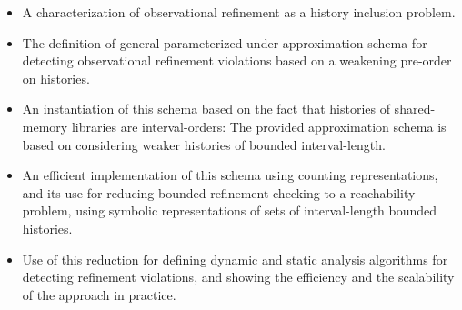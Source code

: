 \begin{itemize}
\item
A characterization of observational refinement as a history inclusion problem.


\item 
The definition of general parameterized under-approximation schema for detecting observational refinement violations based on a weakening pre-order on histories.

\item
An instantiation of this schema based on the fact that histories of shared-memory libraries are interval-orders: The provided approximation schema is based on considering weaker histories of bounded interval-length.

\item
An efficient implementation of this schema using counting representations, and its use for reducing bounded refinement checking to a reachability problem, using %
symbolic representations of sets of interval-length bounded histories.



\item 
Use of this reduction for defining dynamic and static analysis algorithms for detecting refinement violations, and showing the efficiency and the scalability of the approach in practice.

\end{itemize}








